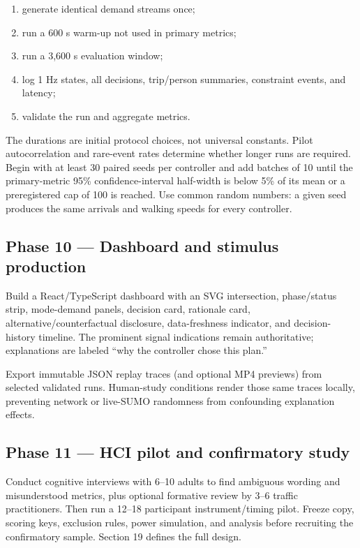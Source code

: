 \documentclass[
  english,
  11pt,
  a4paper,
]{article}
\providecommand{\tightlist}{%
  \setlength{\itemsep}{0pt}\setlength{\parskip}{0pt}}
\begin{document}
\begin{enumerate}
\def\labelenumi{\arabic{enumi}.}
\tightlist
\item
  generate identical demand streams once;
\item
  run a 600 s warm-up not used in primary metrics;
\item
  run a 3,600 s evaluation window;
\item
  log 1 Hz states, all decisions, trip/person summaries, constraint
  events, and latency;
\item
  validate the run and aggregate metrics.
\end{enumerate}

The durations are initial protocol choices, not universal constants.
Pilot autocorrelation and rare-event rates determine whether longer runs
are required. Begin with at least 30 paired seeds per controller and add
batches of 10 until the primary-metric 95\% confidence-interval
half-width is below 5\% of its mean or a preregistered cap of 100 is
reached. Use common random numbers: a given seed produces the same
arrivals and walking speeds for every controller.

\subsection{Phase 10 --- Dashboard and stimulus
production}\label{phase-10-dashboard-and-stimulus-production}

Build a React/TypeScript dashboard with an SVG intersection,
phase/status strip, mode-demand panels, decision card, rationale card,
alternative/counterfactual disclosure, data-freshness indicator, and
decision-history timeline. The prominent signal indications remain
authoritative; explanations are labeled ``why the controller chose this
plan.''

Export immutable JSON replay traces (and optional MP4 previews) from
selected validated runs. Human-study conditions render those same traces
locally, preventing network or live-SUMO randomness from confounding
explanation effects.

\subsection{Phase 11 --- HCI pilot and confirmatory
study}\label{phase-11-hci-pilot-and-confirmatory-study}

Conduct cognitive interviews with 6--10 adults to find ambiguous wording
and misunderstood metrics, plus optional formative review by 3--6
traffic practitioners. Then run a 12--18 participant instrument/timing
pilot. Freeze copy, scoring keys, exclusion rules, power simulation, and
analysis before recruiting the confirmatory sample. Section 19 defines
the full design.
\end{document}
